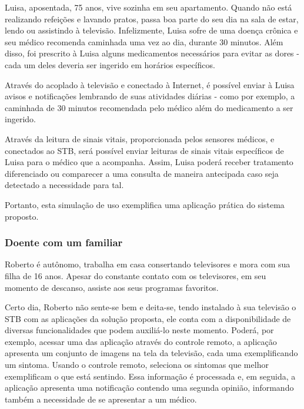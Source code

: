 Luisa, aposentada, 75 anos, vive sozinha em seu apartamento. Quando não está
realizando refeições e lavando pratos, passa boa parte do seu dia na sala de
estar, lendo ou assistindo à televisão. Infelizmente, Luisa sofre de uma doença 
crônica e seu médico recomenda caminhada uma vez ao dia, durante 30 minutos. 
Além disso, foi prescrito à Luisa alguns medicamentos necessários para evitar 
as dores - cada um deles deveria ser ingerido em horários específicos.

Através do \stb[] acoplado à televisão e conectado à Internet, é
possível enviar à Luisa avisos e notificações lembrando de suas atividades
diárias - como por exemplo, a caminhada de 30 minutos recomendada pelo
médico além do medicamento a ser ingerido.

Através da leitura de sinais vitais, proporcionada pelos sensores médicos,
e conectados ao STB, será possível enviar leituras de sinais vitais específicos 
de Luisa para o médico que a acompanha. Assim, Luisa poderá receber tratamento
diferenciado ou comparecer a uma consulta de maneira antecipada caso seja
detectado a necessidade para tal.

Portanto, esta simulação de uso exemplifica uma aplicação prática do sistema 
proposto.


\subsubsection{Doente com um familiar} \label{subsubsec:doente-com-familiar}

Roberto é autônomo, trabalha em casa consertando televisores e mora com sua
filha de 16 anos. Apesar do constante contato com os televisores, em seu momento
de descanso, assiste aos seus programas favoritos.

Certo dia, Roberto não sente-se bem e deita-se, tendo instalado à sua televisão
o STB com as aplicações da solução proposta, ele conta com a disponibilidade de
diversas funcionalidades que podem auxiliá-lo neste momento. Poderá, por
exemplo, acessar uma das aplicação através do controle remoto, a aplicação
apresenta um conjunto de imagens na tela da televisão, cada uma exemplificando
um sintoma.  Usando o controle remoto, seleciona os sintomas que melhor
exemplificam o que está sentindo. Essa informação é processada e, em seguida, a
aplicação apresenta uma notificação contendo uma segunda opinião, informando
também a necessidade de se apresentar a um médico.

